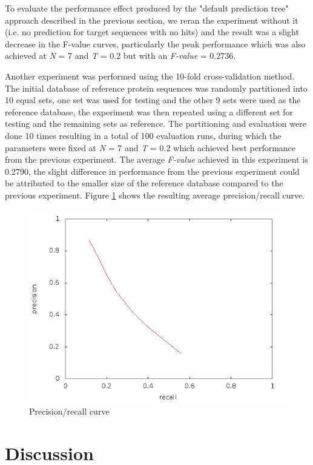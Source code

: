 \documentclass{bioinfo}
\begin{document}
To evaluate the performance effect produced by the "default prediction tree" approach described in the previous section, we reran the experiment without it (i.e. no prediction for target sequences with no hits) and the result was a slight decrease in the F-value curves, particularly the peak performance which was also achieved at \textit{N} = 7 and \textit{T} = 0.2 but with an \textit{F-value} = 0.2736.

Another experiment was performed using the 10-fold cross-validation method. The initial database of reference protein sequences was randomly partitioned into 10 equal sets, one set was used for testing and the other 9 sets were used as the reference database, the experiment was then repeated using a different set for testing and the remaining sets as reference. The partitioning and evaluation were done 10 times resulting in a total of 100 evaluation runs, during which the parameters were fixed at \textit{N} = 7 and \textit{T} = 0.2 which achieved best performance from the previous experiment. The average \textit{F-value} achieved in this experiment is 0.2790, the slight difference in performance from the previous experiment could be attributed to the smaller size of the reference database compared to the previous experiment. Figure \ref{precrec} shows the resulting average precision/recall curve.

\begin{figure}[!tpb]
\centerline{\includegraphics[scale=0.4]{bilder/image-4.png}}
\caption{Precision/recall curve}
\label{precrec}
\end{figure}

\section{Discussion}
\end{document}
